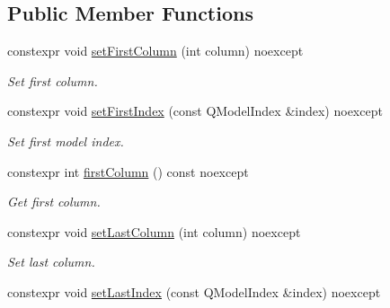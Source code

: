 \subsection*{Public Member Functions}
\begin{DoxyCompactItemize}
\item 
constexpr void \hyperlink{class_mdt_1_1_item_model_1_1_column_range_a780de9fc146d150423f10cdad0b25a1f}{set\+First\+Column} (int column) noexcept\hypertarget{class_mdt_1_1_item_model_1_1_column_range_a780de9fc146d150423f10cdad0b25a1f}{}\label{class_mdt_1_1_item_model_1_1_column_range_a780de9fc146d150423f10cdad0b25a1f}

\begin{DoxyCompactList}\small\item\em Set first column. \end{DoxyCompactList}\item 
constexpr void \hyperlink{class_mdt_1_1_item_model_1_1_column_range_a1746b2f9bdf07485ae2de9dde1df35e6}{set\+First\+Index} (const Q\+Model\+Index \&index) noexcept\hypertarget{class_mdt_1_1_item_model_1_1_column_range_a1746b2f9bdf07485ae2de9dde1df35e6}{}\label{class_mdt_1_1_item_model_1_1_column_range_a1746b2f9bdf07485ae2de9dde1df35e6}

\begin{DoxyCompactList}\small\item\em Set first model index. \end{DoxyCompactList}\item 
constexpr int \hyperlink{class_mdt_1_1_item_model_1_1_column_range_afe9da787f8c3ea4684f19827838b99bf}{first\+Column} () const noexcept
\begin{DoxyCompactList}\small\item\em Get first column. \end{DoxyCompactList}\item 
constexpr void \hyperlink{class_mdt_1_1_item_model_1_1_column_range_a0bbd5f7aacb9288c00ed98d1bcae5a94}{set\+Last\+Column} (int column) noexcept\hypertarget{class_mdt_1_1_item_model_1_1_column_range_a0bbd5f7aacb9288c00ed98d1bcae5a94}{}\label{class_mdt_1_1_item_model_1_1_column_range_a0bbd5f7aacb9288c00ed98d1bcae5a94}

\begin{DoxyCompactList}\small\item\em Set last column. \end{DoxyCompactList}\item 
constexpr void \hyperlink{class_mdt_1_1_item_model_1_1_column_range_a86259634a850ba166c6e105fb680cbcd}{set\+Last\+Index} (const Q\+Model\+Index \&index) noexcept\hypertarget{class_mdt_1_1_item_model_1_1_column_range_a86259634a850ba166c6e105fb680cbcd}{}\label{class_mdt_1_1_item_model_1_1_column_range_a86259634a850ba166c6e105fb680cbcd}


\end{DoxyCompactItemize}
